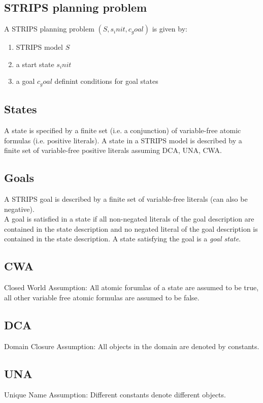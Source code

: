 \documentclass[12pt, a4paper]{article}
\begin{document}
\subsection*{STRIPS planning problem}
A STRIPS planning problem $(S, s_init, c_goal)$ is given by:
\begin{enumerate}
\item STRIPS model $S$
\item a start state $s_init$
\item a goal $c_goal$ definint conditions for goal states
\end{enumerate}


\subsection*{States}
A state is specified by a finite set (i.e. a conjunction) of variable-free atomic formulas (i.e. positive literals). A state in a STRIPS model is described by a finite set of variable-free positive literals assuming DCA, UNA, CWA.

\subsection*{Goals}
A STRIPS goal is described by a finite set of variable-free literals (can also be negative). \\
A goal is satisfied in a state if all non-negated literals of the goal description are contained in the state description and no negated literal of the goal description is contained in the state description. A state satisfying the goal is a \textit{goal state}.

\subsection*{CWA}
Closed World Assumption: All atomic forumlas of a state are assumed to be true, all other variable free atomic formulas are assumed to be false.

\subsection*{DCA}
Domain Closure Assumption: All objects in the domain are denoted by constants.

\subsection*{UNA}
Unique Name Assumption: Different constants denote different objects.
\end{document}

